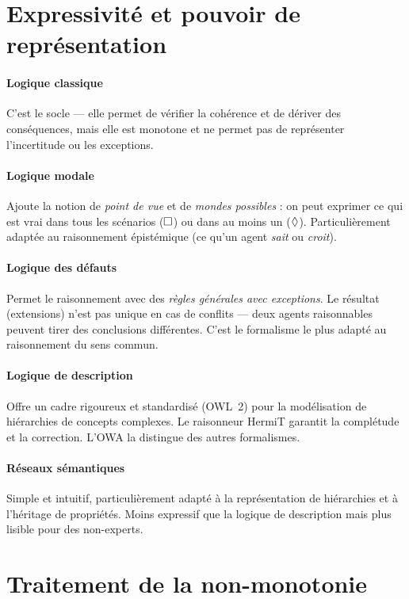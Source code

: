 \section{Expressivité et pouvoir de représentation}

\paragraph{Logique classique} C'est le socle — elle permet de vérifier la
cohérence et de dériver des conséquences, mais elle est monotone et ne permet
pas de représenter l'incertitude ou les exceptions.

\paragraph{Logique modale} Ajoute la notion de \emph{point de vue} et de
\emph{mondes possibles} : on peut exprimer ce qui est vrai dans tous les scénarios
($\Box$) ou dans au moins un ($\Diamond$). Particulièrement adaptée au raisonnement
épistémique (ce qu'un agent \emph{sait} ou \emph{croit}).

\paragraph{Logique des défauts} Permet le raisonnement avec des \emph{règles
générales avec exceptions}. Le résultat (extensions) n'est pas unique en cas
de conflits — deux agents raisonnables peuvent tirer des conclusions différentes.
C'est le formalisme le plus adapté au raisonnement du sens commun.

\paragraph{Logique de description} Offre un cadre rigoureux et standardisé
(OWL~2) pour la modélisation de hiérarchies de concepts complexes.
Le raisonneur HermiT garantit la complétude et la correction.
L'OWA la distingue des autres formalismes.

\paragraph{Réseaux sémantiques} Simple et intuitif, particulièrement adapté
à la représentation de hiérarchies et à l'héritage de propriétés. Moins
expressif que la logique de description mais plus lisible pour des non-experts.

\section{Traitement de la non-monotonie}

